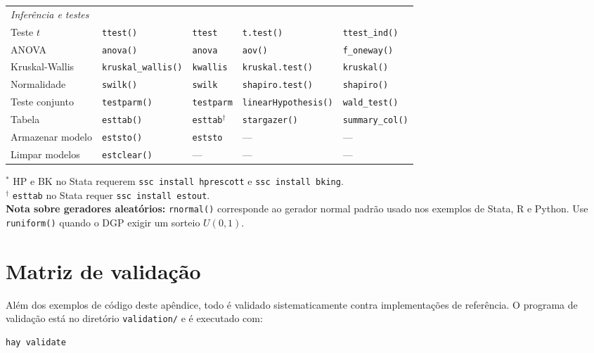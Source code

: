 {\begin{longtable}{lllll}
\midrule
\multicolumn{5}{l}{\textit{Inferência e testes}} \\
Teste $t$       & \texttt{ttest()}      & \texttt{ttest}        & \texttt{t.test()}      & \texttt{ttest\_ind()} \\
ANOVA           & \texttt{anova()}      & \texttt{anova}        & \texttt{aov()}         & \texttt{f\_oneway()} \\
Kruskal-Wallis  & \texttt{kruskal\_wallis()} & \texttt{kwallis} & \texttt{kruskal.test()} & \texttt{kruskal()} \\
Normalidade     & \texttt{swilk()}      & \texttt{swilk}        & \texttt{shapiro.test()} & \texttt{shapiro()} \\
Teste conjunto  & \texttt{testparm()}   & \texttt{testparm}     & \texttt{linearHypothesis()} & \texttt{wald\_test()} \\
Tabela          & \texttt{esttab()}     & \texttt{esttab}$^\dagger$ & \texttt{stargazer()} & \texttt{summary\_col()} \\
Armazenar modelo& \texttt{eststo()}     & \texttt{eststo}       & —                      & —                     \\
Limpar modelos  & \texttt{estclear()}   & —                     & —                      & —                     \\
\end{longtable}}

\noindent
$^*$ HP e BK no Stata requerem \texttt{ssc install hprescott} e \texttt{ssc install bking}.\\
$^\dagger$ \texttt{esttab} no Stata requer \texttt{ssc install estout}.\\[4pt]
\noindent\textbf{Nota sobre geradores aleatórios:} \texttt{rnormal()} corresponde ao
gerador normal padrão usado nos exemplos de Stata, R e Python. Use
\texttt{runiform()} quando o DGP exigir um sorteio $U(0,1)$.

\section{Matriz de validação}
\label{sec:matriz_validacao}

Além dos exemplos de código deste apêndice, todo \hayashi{} é validado
sistematicamente contra implementações de referência. O programa de
validação está no diretório \texttt{validation/} e é executado com:

\begin{lstlisting}
hay validate
\end{lstlisting}

